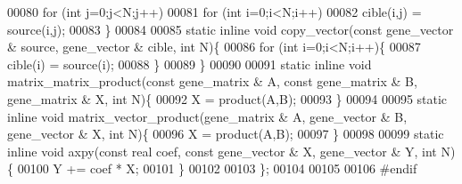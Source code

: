 \begin{DoxyCode}
00080     \textcolor{keywordflow}{for} (\textcolor{keywordtype}{int} j=0;j<N;j++)
00081       \textcolor{keywordflow}{for} (\textcolor{keywordtype}{int} i=0;i<N;i++)
00082         cible(i,j) = source(i,j);
00083   \}
00084 
00085   \textcolor{keyword}{static} \textcolor{keyword}{inline} \textcolor{keywordtype}{void} copy\_vector(\textcolor{keyword}{const} gene\_vector & source, gene\_vector & cible, \textcolor{keywordtype}{int} N)\{
00086     \textcolor{keywordflow}{for} (\textcolor{keywordtype}{int} i=0;i<N;i++)\{
00087       cible(i) = source(i);
00088     \}
00089   \}
00090 
00091   \textcolor{keyword}{static} \textcolor{keyword}{inline} \textcolor{keywordtype}{void} matrix\_matrix\_product(\textcolor{keyword}{const} gene\_matrix & A, \textcolor{keyword}{const} gene\_matrix & B, gene\_matrix & X, \textcolor{keywordtype}{
      int} N)\{
00092     X = product(A,B);
00093   \}
00094 
00095   \textcolor{keyword}{static} \textcolor{keyword}{inline} \textcolor{keywordtype}{void} matrix\_vector\_product(gene\_matrix & A, gene\_vector & B, gene\_vector & X, \textcolor{keywordtype}{int} N)\{
00096     X = product(A,B);
00097   \}
00098 
00099   \textcolor{keyword}{static} \textcolor{keyword}{inline} \textcolor{keywordtype}{void} axpy(\textcolor{keyword}{const} real coef, \textcolor{keyword}{const} gene\_vector & X, gene\_vector & Y, \textcolor{keywordtype}{int} N)\{
00100     Y += coef * X;
00101   \}
00102 
00103 \};
00104 
00105 
00106 \textcolor{preprocessor}{#endif}
\end{DoxyCode}
